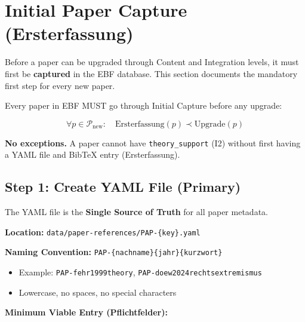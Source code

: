 
\section{Initial Paper Capture (Ersterfassung)}
\label{sec:paperint-ersterfassung}

Before a paper can be upgraded through Content and Integration levels, it must first
be \textbf{captured} in the EBF database. This section documents the mandatory first
step for every new paper.

\begin{tcolorbox}[colback=green!5!white, colframe=green!75!black,
    title=\textbf{Axiom ERST-1: Mandatory Initial Capture}]

Every paper in EBF MUST go through Initial Capture before any upgrade:

\begin{equation}
\forall p \in \mathcal{P}_{\text{new}}: \quad \text{Ersterfassung}(p) \prec \text{Upgrade}(p)
\end{equation}

\textbf{No exceptions.} A paper cannot have \texttt{theory\_support} (I2) without first
having a YAML file and BibTeX entry (Ersterfassung).

\end{tcolorbox}

\subsection{Step 1: Create YAML File (Primary)}
\label{sec:ersterfassung-yaml}

The YAML file is the \textbf{Single Source of Truth} for all paper metadata.

\textbf{Location:} \texttt{data/paper-references/PAP-\{key\}.yaml}

\textbf{Naming Convention:} \texttt{PAP-\{nachname\}\{jahr\}\{kurzwort\}}
\begin{itemize}[nosep]
    \item Example: \texttt{PAP-fehr1999theory}, \texttt{PAP-doew2024rechtsextremismus}
    \item Lowercase, no spaces, no special characters
\end{itemize}

\textbf{Minimum Viable Entry (Pflichtfelder):}

